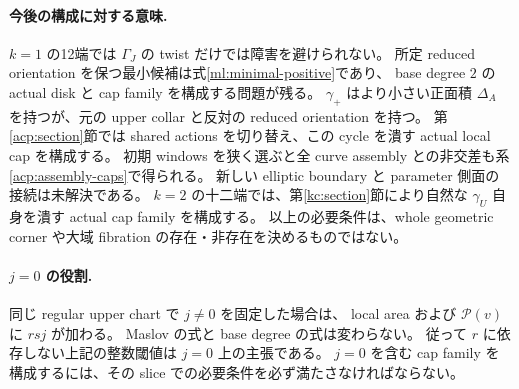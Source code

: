 \paragraph{今後の構成に対する意味.}
$k=1$ の12端では $\Gamma_J$ の twist だけでは障害を避けられない。
所定 reduced orientation を保つ最小候補は式\eqref{ml:minimal-positive}であり、
base degree $2$ の actual disk と cap family を構成する問題が残る。
$\gamma_+$ はより小さい正面積 $\Delta_A$ を持つが、元の upper collar と反対の reduced orientation を持つ。
第\ref{acp:section}節では shared actions を切り替え、この cycle を潰す actual local cap を構成する。
初期 windows を狭く選ぶと全 curve assembly との非交差も系\ref{acp:assembly-caps}で得られる。
新しい elliptic boundary と parameter 側面の接続は未解決である。
$k=2$ の十二端では、第\ref{kc:section}節により自然な $\gamma_U$ 自身を潰す actual cap family を構成する。
以上の必要条件は、whole geometric corner や大域 fibration の存在・非存在を決めるものではない。

\paragraph{$j=0$ の役割.}
同じ regular upper chart で $j\ne0$ を固定した場合は、
local area および $\mathcal P(v)$ に $rsj$ が加わる。
Maslov の式と base degree の式は変わらない。
従って $r$ に依存しない上記の整数閾値は $j=0$ 上の主張である。
$j=0$ を含む cap family を構成するには、その slice での必要条件を必ず満たさなければならない。
